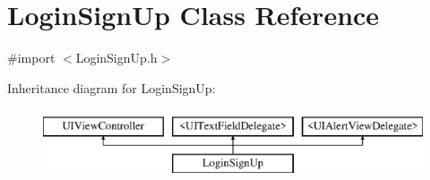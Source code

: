 \hypertarget{interface_login_sign_up}{\section{Login\+Sign\+Up Class Reference}
\label{interface_login_sign_up}
}


{\ttfamily \#import $<$Login\+Sign\+Up.\+h$>$}

Inheritance diagram for Login\+Sign\+Up\+:\begin{figure}[H]
\begin{center}
\leavevmode
\includegraphics[height=2.000000cm]{interface_login_sign_up}
\end{center}
\end{figure}
